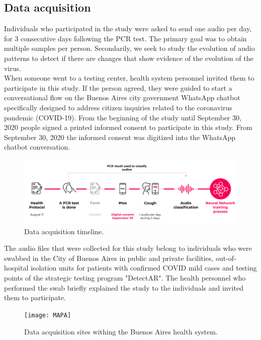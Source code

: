 \documentclass{nle}
\begin{document}
\subsection{Data acquisition}

Individuals who participated in the study were asked to send one audio per day, for 3 consecutive days following the PCR test. The primary goal was to obtain multiple samples per person. Secondarily, we seek to study the evolution of audio patterns to detect if there are changes that show evidence of the evolution of the virus.\\

When someone went to a testing center, health system personnel invited them to participate in this study. If the person agreed, they were guided to start a conversational flow on the Buenos Aires city government WhatsApp chatbot specifically designed to address citizen inquiries related to the coronavirus pandemic (COVID-19). From the beginning of the study until September 30, 2020 people signed a printed informed consent to participate in this study. From September 30, 2020 the informed consent was digitized  into the WhatsApp chatbot conversation.

\begin{figure}[htp]
    \centering
    \includegraphics[width=12cm]{DATAACQUISITION}
    \caption{Data acquisition timeline.}
    \label{fig:timeline}
\end{figure}

The audio files that were collected for this study belong to individuals who were swabbed in the City of Buenos Aires in public and private facilities, out-of-hospital isolation units for patients with confirmed COVID mild cases and testing points of the strategic testing program "DetectAR".  The health personnel who performed the swab briefly explained the study to the individuals and invited them to participate.

\begin{figure}[htp]
    \centering
    \texttt{[image: MAPA]}
    \caption{Data acquisition sites withing the Buenos Aires health system.}
    \label{fig:sites}
\end{figure}
\end{document}
